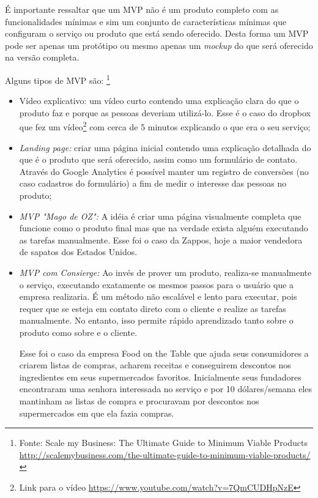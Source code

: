     \par É importante ressaltar que um MVP não é um produto completo com as funcionalidades mínimas e sim um conjunto de características mínimas que configuram o serviço ou produto que está sendo oferecido. Desta forma um MVP pode ser apenas um protótipo ou mesmo apenas um \emph{mockup} do que será oferecido na versão completa.
    \par Alguns tipos de MVP são: \footnote{ Fonte: Scale my Business: The Ultimate Guide to Minimum Viable Products  \url{http://scalemybusiness.com/the-ultimate-guide-to-minimum-viable-products/}}
\begin{itemize}
\item Vídeo explicativo: um vídeo curto contendo uma explicação clara do que o produto faz e porque as pessoas deveriam utilizá-lo. Esse é o caso do dropbox que fez um vídeo\footnote{Link para o vídeo  \url{https://www.youtube.com/watch?v=7QmCUDHpNzE}} com cerca de 5 minutos explicando o que era o seu serviço;
\item \emph{Landing page:}
criar uma página inicial contendo uma explicação detalhada do que é o produto que será oferecido, assim como um formulário de contato. Através do Google Analytics é possível manter um registro de conversões (no caso cadastros do formulário) a fim de medir o interesse das pessoas no produto;
\item \emph{MVP "Mago de OZ":}
A idéia é criar uma página visualmente completa que funcione como o produto final mas que na verdade exista alguém executando as tarefas manualmente. Esse foi o caso da Zappos, hoje a maior vendedora de sapatos dos Estados Unidos.
\item \emph{ MVP com Consierge:}
Ao invés de prover um produto, realiza-se manualmente o serviço, executando exatamente os mesmos passos para o usuário que a empresa realizaria. É um método não escalável e lento para executar, pois requer que se esteja em contato direto com o cliente e realize as tarefas manualmente. No entanto, isso permite rápido aprendizado tanto sobre o produto como sobre e o cliente. 
\par Esse foi o caso da empresa Food on the Table que ajuda seus consumidores a criarem listas de compras, acharem receitas e conseguirem descontos nos ingredientes em seus supermercados favoritos. Inicialmente seus fundadores encontraram uma senhora interessada no serviço e por 10 dólares/semana eles mantinham as listas de compra e procuravam por descontos nos supermercados em que ela fazia compras.
\end{itemize}

